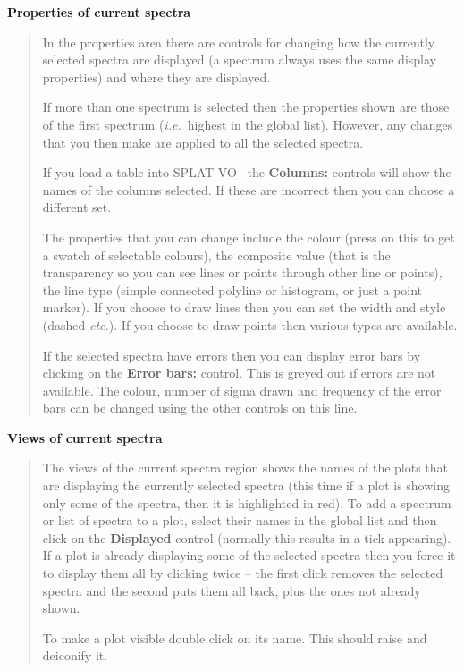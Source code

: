 \documentclass[twoside,11pt,nolof]{starlink}
\providecommand{\SPLAT}{\textsf{SPLAT-VO }}
\newcommand{\labelitem}[1]{\textbf{#1}}
\providecommand{\ie}{\textit{i.e.}}
\providecommand{\etc}{\textit{etc.}}
\providecommand{\subheading}[1]{\textbf{\large{#1}}}
\begin{document}
\subheading{Properties of current spectra}
\begin{quote}
 In the properties area there are controls for changing how the currently
 selected spectra are displayed (a spectrum always uses the same display
 properties) and where they are displayed.

 If more than one spectrum is selected then the properties shown are those of
 the first spectrum (\ie\ highest in the global list). However, any changes
 that you then make are applied to all the selected spectra.

 If you load a table into \SPLAT\ the \labelitem{Columns:} controls will show
 the names of the columns selected. If these are incorrect then you can choose
 a different set.

 The properties that you can change include the colour (press on this to get a
 swatch of selectable colours), the composite value (that is the transparency
 so you can see lines or points through other line or points), the line type
 (simple connected polyline or histogram, or just a point marker). If you
 choose to draw lines then you can set the width and style (dashed \etc). If
 you choose to draw points then various types are available.

 If the selected spectra have errors then you can display error bars by
 clicking on the \labelitem{Error bars:} control. This is greyed out if errors
 are not available. The colour, number of sigma drawn and frequency of the
 error bars can be changed using the other controls on this line.

\end{quote}

\subheading{Views of current spectra}
\begin{quote}
 The views of the current spectra region shows the names of the plots that are
 displaying the currently selected spectra (this time if a plot is showing
 only some of the spectra, then it is highlighted in red). To add a spectrum
 or list of spectra to a plot, select their names in the global list and then
 click on the \labelitem{Displayed} control (normally this results in a tick
 appearing). If a plot is already displaying some of the selected spectra then
 you force it to display them all by clicking twice -- the first click removes
 the selected spectra and the second puts them all back, plus the ones not
 already shown.

 To make a plot visible double click on its name. This should raise and
 deiconify it.
\end{quote}
\end{document}
